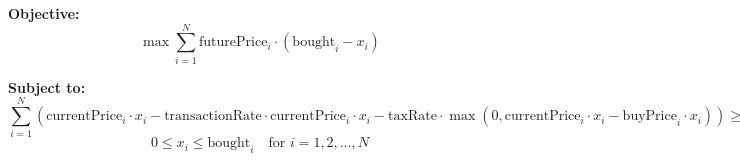 \documentclass{article}
\begin{document}
\textbf{Objective:}
\[
\max \sum_{i=1}^{N} \text{futurePrice}_i \cdot (\text{bought}_i - x_i)
\]

\textbf{Subject to:}
\[
\sum_{i=1}^{N} \left( \text{currentPrice}_i \cdot x_i - \text{transactionRate} \cdot \text{currentPrice}_i \cdot x_i - \text{taxRate} \cdot \max(0, \text{currentPrice}_i \cdot x_i - \text{buyPrice}_i \cdot x_i) \right) \geq K
\]
\[
0 \leq x_i \leq \text{bought}_i \quad \text{for } i=1,2,\ldots,N
\]
\end{document}
